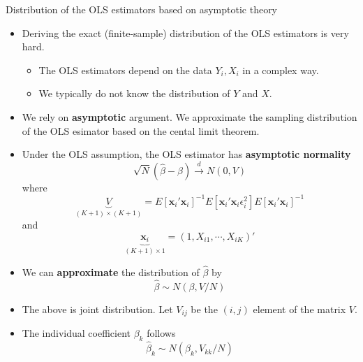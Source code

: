 \documentclass[
  ignorenonframetext,
]{beamer}
\providecommand{\tightlist}{%
  \setlength{\itemsep}{0pt}\setlength{\parskip}{0pt}}
\begin{document}
\begin{frame}{Distribution of the OLS estimators based on asymptotic
theory}
\protect\hypertarget{distribution-of-the-ols-estimators-based-on-asymptotic-theory}{}

\begin{itemize}
\tightlist
\item
  Deriving the exact (finite-sample) distribution of the OLS estimators
  is very hard.

  \begin{itemize}
  \tightlist
  \item
    The OLS estimators depend on the data \(Y_i, X_i\) in a complex way.
  \item
    We typically do not know the distribution of \(Y\) and \(X\).
  \end{itemize}
\item
  We rely on \textbf{asymptotic} argument. We approximate the sampling
  distribution of the OLS esimator based on the cental limit theorem.
\end{itemize}

\end{frame}

\begin{frame}

\begin{itemize}
\tightlist
\item
  Under the OLS assumption, the OLS estimator has \textbf{asymptotic
  normality} \[
  \sqrt{N}(\hat{\beta}-\beta)\overset{d}{\rightarrow}N\left(0,V \right)    
    \] where \[
    \underbrace{V}_{(K+1)\times(K+1)}
     = E[\mathbf{x}_{i}'\mathbf{x}_{i}]^{-1}E[\mathbf{x}_{i}'\mathbf{x}_{i}\epsilon_{i}^{2}]E[\mathbf{x}_{i}'\mathbf{x}_{i}]^{-1}
    \] and \[
    \underbrace{\mathbf{x}_{i}}_{(K+1)\times1}=\left( 1, X_{i1},\cdots,X_{iK} \right)'
  \]
\item
  We can \textbf{approximate} the distribution of \(\hat{\beta}\) by \[
    \hat{\beta} \sim N(\beta, V / N)
    \]
\item
  The above is joint distribution. Let \(V_{ij}\) be the \((i,j)\)
  element of the matrix \(V\).
\item
  The individual coefficient \(\beta_k\) follows \[
   \hat\beta_k \sim N(\beta_k, V_{kk} / N )
  \]
\end{itemize}

\end{frame}
\end{document}
